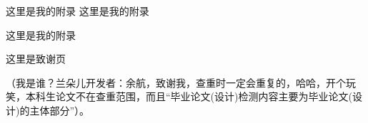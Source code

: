 \documentclass[AutoFakeBold]{LZUThesis}
\begin{document}
\backmatter


\printbib

\Appendix

这里是我的附录
这里是我的附录

这里是我的附录

\Thanks

这里是致谢页

（我是谁？兰朵儿开发者：余航，致谢我，查重时一定会重复的，哈哈，开个玩笑，本科生论文不在查重范围，而且“毕业论文(设计)检测内容主要为毕业论文(设计)的主体部分”）。


\Grade %
\end{document}
